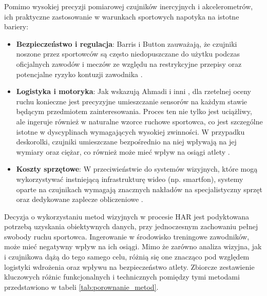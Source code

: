         Pomimo wysokiej precyzji pomiarowej czujników inercyjnych i akcelerometrów, ich praktyczne zastosowanie w warunkach sportowych napotyka na istotne bariery:
        \begin{itemize}
            \item \textbf{Bezpieczeństwo i regulacja}: Barris i Button \cite{barris2008review} zauważają, że czujniki noszone przez sportowców są często niedopuszczane do użytku podczas oficjalnych zawodów i meczów ze względu na restrykcyjne przepisy oraz potencjalne ryzyko kontuzji zawodnika \cite{barris2008review}.
            \item \textbf{Logistyka i motoryka}: Jak wskazują Ahmadi i inni \cite{ahmadi2015toward}, dla rzetelnej oceny ruchu konieczne jest precyzyjne umieszczanie sensorów na każdym stawie będącym przedmiotem zainteresowania. Proces ten nie tylko jest uciążliwy, ale ingeruje również w naturalne wzorce ruchowe sportowca, co jest szczególne istotne w dyscyplinach wymagających wysokiej zwinności. W przypadku deskorolki, czujniki umieszczane bezpośrednio na niej wpływają na jej wymiary oraz ciężar, co również może mieć wpływ na osiągi atlety \cite{ahmadi2015toward}.
            \item \textbf{Koszty sprzętowe}: W przeciwieństwie do systemów wizyjnych, które mogą wykorzystywać instniejącą infrastrukturę wideo (np. smartfon), systemy oparte na czujnikach wymagają znacznych nakładów na specjalistyczny sprzęt oraz dedykowane zaplecze obliczeniowe \cite{barris2008review}.
        \end{itemize}

        Decyzja o wykorzystaniu metod wizyjnych w procesie HAR jest podyktowana potrzebą uzyskania obiektywnych danych, przy jednoczesnym zachowaniu pełnej swobody ruchu sportowca. Ingerowanie w środowisko treningowe zawodników, może mieć negatywny wpływ na ich osiągi. Mimo że zarówno analiza wizyjna, jak i czujnikowa dążą do tego samego celu, różnią się one znacząco pod względem logistyki wdrożenia oraz wpływu na bezpieczeństwo atlety. Zbiorcze zestawienie kluczowych różnic funkcjonalnych i technicznych pomiędzy tymi metodami przedstawiono w tabeli \ref{tab:porownanie_metod}.

